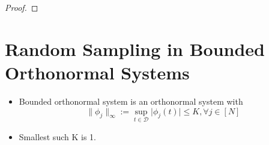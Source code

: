 \documentclass[11pt,reqno]{amsart}
\theoremstyle{remark}
\begin{document}
\begin{sloppypar}
\begin{itemize}
\begin{proof}
\end{proof}
\end{itemize}
\section*{Random Sampling in Bounded Orthonormal Systems}
\begin{itemize}
\item Bounded orthonormal system is an orthonormal system with
\[
\lVert \phi_j\rVert_\infty:=\sup_{t\in\mathcal{D}}\lvert \phi_j(t)\rvert\leq K, \forall j\in [N]
\]
\item Smallest such K is 1.
\end{itemize}
\end{sloppypar}
\end{document}
